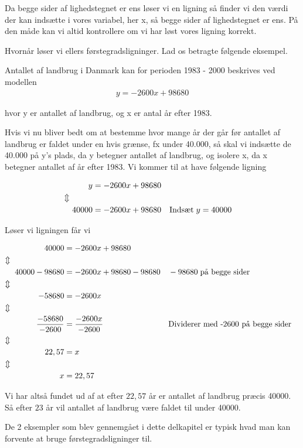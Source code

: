 Da begge sider af lighedstegnet er ens 
løser vi en ligning så finder vi den værdi der kan indsætte i vores variabel, her x, så begge sider af lighedstegnet er ens.
På den måde kan vi altid kontrollere om vi har løst vores ligning korrekt.

Hvornår løser vi ellers førstegradsligninger. Lad os betragte følgende eksempel.

Antallet af landbrug i Danmark kan for perioden 1983 - 2000 beskrives ved modellen 
\begin{align*}
    y = -2600x + 98680
\end{align*}

hvor y er antallet af landbrug, og x er antal år efter 1983.

Hvis vi nu bliver bedt om at bestemme hvor mange år der går før antallet af landbrug er faldet under en hvis grænse, fx under 40.000, så skal vi indsætte de 40.000 på y's plads, da y betegner antallet af landbrug, og isolere x, da x betegner antallet af år efter 1983. Vi kommer til at have følgende ligning

\begin{align*}
    y &= -2600x + 98680\\
    \Updownarrow \hspace{1cm}&\\
    40000 &= -2600x + 98680 && \text{Indsæt} \hspace{1mm} y = 40000
\end{align*}

Løser vi ligningen får vi

\begin{align*}
    40000 &= -2600x + 98680\\
     \Updownarrow \hspace{2.4cm}&\\
     40000 - 98680 &= -2600x + 98680 - 98680 && -98680 \hspace{1mm} \text{på begge sider}\\
      \Updownarrow \hspace{2.4cm}&\\
      -58680 &= -2600x\\
       \Updownarrow \hspace{2.4cm}&\\
       \frac{-58680}{-2600} &= \frac{-2600x}{-2600} && \text{Dividerer med -2600 på begge sider}\\
        \Updownarrow \hspace{2.4cm}&\\
        22,57 &= x\\
         \Updownarrow \hspace{2.4cm}&\\
         x &= 22,57
\end{align*}

Vi har altså fundet ud af at efter $22,57$ år er antallet af landbrug præcis 40000. Så efter $23$ år vil antallet af landbrug være faldet til under 40000. 

De 2 eksempler som blev gennemgået i dette delkapitel er typisk hvad man kan forvente at bruge førstegradsligninger til. 